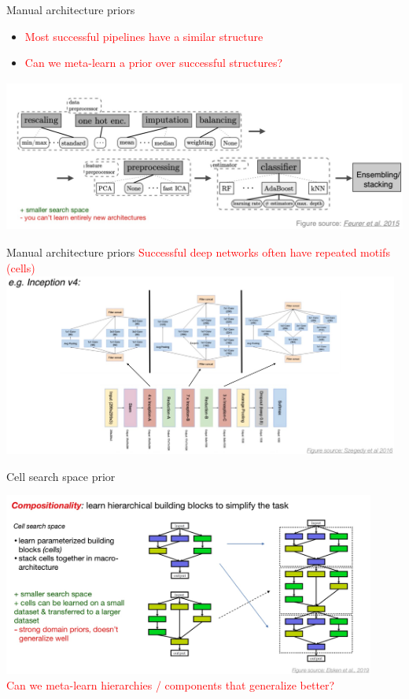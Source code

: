 \begin{frame}{Manual architecture priors}
\begin{itemize}
\item \textcolor{red}{Most successful pipelines have a similar structure}
\item \textcolor{red}{Can we meta-learn a prior over successful structures?} 
\end{itemize}


\centering\includegraphics[height=5cm]{image/img200135.jpg}

\end{frame}

\begin{frame}{Manual architecture priors}
\textcolor{red}{Successful deep networks often have repeated motifs (cells)}
\centering\includegraphics[height=6cm]{image/img200331.jpg}

\end{frame}

\begin{frame}{Cell search space prior}

\centering\includegraphics[height=6cm]{image/img200520.jpg}
\pause
\\\small\textcolor{red}{Can we meta-learn hierarchies / components that generalize better?}

\end{frame}

